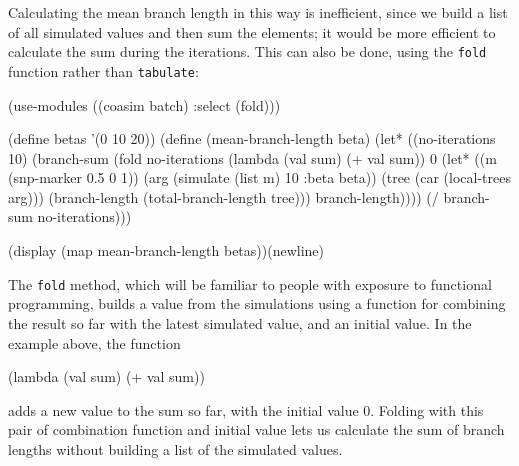 \documentclass{manual}
\begin{document}
Calculating the mean branch length in this way is inefficient, since
we build a list of all simulated values and then sum the elements; it
would be more efficient to calculate the sum during the iterations.
This can also be done, using the \texttt{fold} function rather than
\texttt{tabulate}:

\begin{code}
(use-modules ((coasim batch) :select (fold)))

(define betas '(0 10 20))
(define (mean-branch-length beta)
  (let* ((no-iterations 10)
         (branch-sum
          (fold no-iterations (lambda (val sum) (+ val sum)) 0
                (let* ((m (snp-marker 0.5 0 1))
                       (arg (simulate (list m) 10 :beta beta))
                       (tree (car (local-trees arg)))
                       (branch-length (total-branch-length tree)))
                  branch-length))))
    (/ branch-sum no-iterations)))

(display (map mean-branch-length betas))(newline)
\end{code}

The \texttt{fold} method, which will be familiar to people with
exposure to functional programming, builds a value from the
simulations using a function for combining the result so far with the
latest simulated value, and an initial value.  In the example above,
the function
\begin{code}
     (lambda (val sum) (+ val sum))
\end{code}
adds a new value to the sum so far, with the initial value 0.  Folding
with this pair of combination function and initial value lets us
calculate the sum of branch lengths without building a list of the
simulated values.
\end{document}
